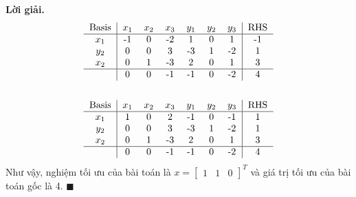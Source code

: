 \documentclass[12pt]{article}
\newenvironment{solution}{%
     \setlength\parindent{0pt}\par\medskip\textbf{Lời giải.}\quad}{%
     \hfill\tiny$\blacksquare$\par\medskip}
\begin{document}
\begin{solution}
\begin{align*}
\begin{tabular}{c|cccccc|c}
                Basis &$x_1$ & $x_2$ & $x_3$ & $y_1$ & $y_2$ & $y_3$ & RHS \\ \hline
                $x_1$ & -1 & 0 & -2 & 1 & 0 & 1 & -1 \\
                $y_2$ & 0 & 0 & 3 & -3 & 1 & -2 & 1 \\
                $x_2$ & 0 & 1 & -3 & 2 & 0 & 1 & 3 \\ \hline
                & 0 & 0 & -1 & -1 & 0 & -2 & 4 \\
            \end{tabular}
            \\
            \\
            \begin{tabular}{c|cccccc|c}
                Basis &$x_1$ & $x_2$ & $x_3$ & $y_1$ & $y_2$ & $y_3$ & RHS \\ \hline
                $x_1$ & 1 & 0 & 2 & -1 & 0 & -1 & 1 \\
                $y_2$ & 0 & 0 & 3 & -3 & 1 & -2 & 1 \\
                $x_2$ & 0 & 1 & -3 & 2 & 0 & 1 & 3 \\ \hline
                & 0 & 0 & -1 & -1 & 0 & -2 & 4 \\
            \end{tabular}
        \end{align*}
        Như vậy, nghiệm tối ưu của bài toán là $x = \begin{bmatrix} 1 & 1 & 0 \end{bmatrix}^T$ và giá trị tối ưu của bài toán gốc là 4.
    \end{solution}
\end{document}

